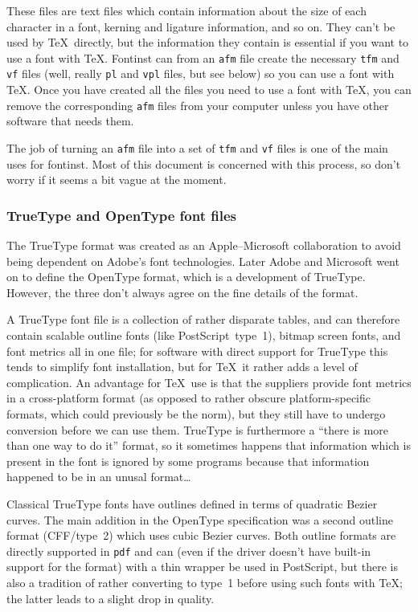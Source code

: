 \documentclass[a4paper]{ltxguide}
\newcommand{\PS}{Post\-Script\xspace}
\newcommand{\TT}{True\-Type\xspace}
\newcommand*{\setfilename}[1]{\texttt{#1}}
\newcommand*{\setpackagename}[1]{\textsf{#1}}
\newcommand{\fontinst}{\setpackagename{font\-inst}\xspace}
\newcommand{\Fontinst}{\setpackagename{Font\-inst}\xspace}
\newcommand{\vf} {\setfilename{vf}\xspace}
\newcommand{\pl} {\setfilename{pl}\xspace}
\newcommand{\afm}{\setfilename{afm}\xspace}
\newcommand{\vpl}{\setfilename{vpl}\xspace}
\newcommand{\tfm}{\setfilename{tfm}\xspace}
\newcommand{\pdf}{\setfilename{pdf}\xspace}
\begin{document}
These files are text files which contain information about the
size of each character in a font, kerning and ligature
information, and so on.  They can't be used by \TeX\ directly, but
the information they contain is essential if you want to use a
font with \TeX. \Fontinst can from an \afm file create the
necessary \tfm and \vf files (well, really \pl and \vpl files, but 
see below) so you can use a font with \TeX.
Once you have created all the files you need to use a font with
\TeX, you can remove the corresponding \afm files from your
computer unless you have other software that needs them.

The job of turning an \afm file into a set of \tfm and \vf files
is one of the main uses for \fontinst.  Most of this document is
concerned with this process, so don't worry if it seems a bit
vague at the moment.


\subsubsection{\TT and OpenType font files}

The \TT format was created as an Apple--Microsoft collaboration to 
avoid being dependent on Adobe's font technologies. Later Adobe and 
Microsoft went on to define the OpenType format, which is a 
development of \TT. However, the three don't always agree on the 
fine details of the format.

A \TT font file is a collection of rather disparate tables, and can 
therefore contain scalable outline fonts (like \PS~type~1), bitmap 
screen fonts, and font metrics all in one file; for software with 
direct support for \TT this tends to simplify font installation, but 
for \TeX\ it rather adds a level of complication. An advantage for 
\TeX\ use is that the suppliers provide font metrics in a 
cross-platform format (as opposed to rather obscure platform-specific 
formats, which could previously be the norm), but they still have to 
undergo conversion before we can use them. \TT is furthermore a 
``there is more than one way to do it'' format, so it sometimes 
happens that information which is present in the font is ignored by 
some programs because that information happened to be in an unusal 
format\dots

Classical \TT fonts have outlines defined in terms of quadratic 
Bezier curves. The main addition in the OpenType specification was a 
second outline format (CFF\slash type~2) which uses cubic Bezier 
curves. Both outline formats are directly supported in \pdf and can 
(even if the driver doesn't have built-in support for the format)
with a thin wrapper be used in \PS, but there is also a tradition of 
rather converting to type~1 before using such fonts with \TeX; the 
latter leads to a slight drop in quality.
\end{document}
